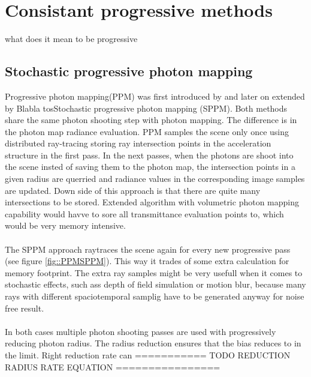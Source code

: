 \chapter{Consistant progressive methods}
what does it mean to be progressive
\section{Stochastic progressive photon mapping}
Progressive photon mapping(PPM) was first introduced by \cite{} and later on extended by Blabla tosStochastic progressive photon mapping (SPPM). Both methods share the same photon shooting  step with photon mapping. The difference is in the photon map radiance evaluation. PPM samples the scene only once using distributed ray-tracing storing ray intersection points in the acceleration structure in the first pass. In the next passes, when the photons are shoot into the scene insted of saving them to the photon map, the intersection points in a given radius are querried and radiance values in the corresponding image samples are updated. Down side of this approach is that there are quite many intersections to be stored. Extended algorithm with volumetric photon mapping capability would havve to sore all transmittance evaluation points to, which would be very memory intensive.
\\
\\
The SPPM approach raytraces the scene again for every new progressive pass (see figure \ref{fig::PPMSPPM}). This way it trades of some extra calculation for memory footprint. The extra ray samples might be very usefull when it comes to stochastic effects, such ass depth of field simulation or motion blur, because many rays with different spaciotemporal samplig have to be generated anyway for noise free result.
\\
\\
In both cases multiple photon shooting passes are used with progressively reducing photon radius. The radius reduction ensures that the bias reduces to in the limit. Right reduction rate can 
=========== TODO REDUCTION RADIUS RATE EQUATION ================



